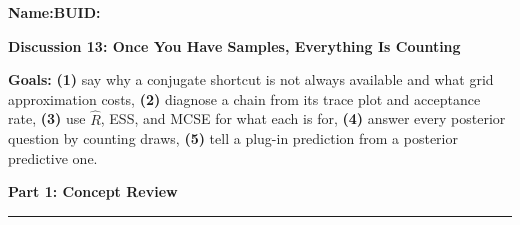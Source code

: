 \documentclass[11pt]{article}
\newcommand{\blankline}[1]{\underline{\hspace{#1}}}
\newcommand{\parttitle}[1]{%
  \par\medskip\noindent
  {\large\bfseries #1}\par
  \vspace{-.5em}\noindent\rule{\linewidth}{0.4pt}\par\smallskip}
\begin{document}
\noindent\textbf{Name:}\blankline{2.3in}\hfill\textbf{BUID:}\blankline{1.6in}

\begin{center}
  {\Large\bfseries Discussion 13: Once You Have Samples, Everything Is Counting}
\end{center}

\noindent\textbf{Goals:} \textbf{(1)} say why a conjugate shortcut is not always available and what
grid approximation costs, \textbf{(2)} diagnose a chain from its trace plot and acceptance rate,
\textbf{(3)} use $\widehat{R}$, ESS, and MCSE for what each is for, \textbf{(4)} answer every
posterior question by counting draws, \textbf{(5)} tell a plug-in prediction from a posterior
predictive one.

\parttitle{Part 1: Concept Review}
\end{document}
